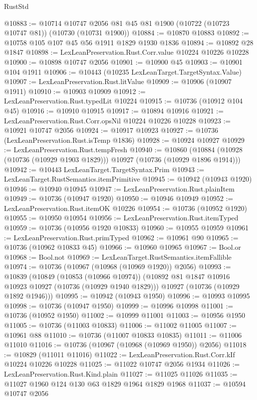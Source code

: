 \begin{lexlean}{RustStd}
\begin{coremodule}
@10883 := @10714 @10747 @2056 @81 @45 @81 @1900 (@10722 (@10723 @10747 @81)) (@10730 (@10731 @1900))
@10884 := @10870 @10883
@10892 := @10758 @105 @107 @45 @56 @1911 @1829 @1930 @1836
@10894 := @10892 @28 @1847
@10898 := LexLeanPreservation.Rust.Corr.value @10224 @10226 @10228
@10900 := @10898 @10747 @2056
@10901 := @10900 @45
@10903 := @10901 @104 @1911
@10906 := @10443 (@10235 LexLeanTarget.TargetSyntax.Value)
@10907 := LexLeanPreservation.Rust.litValue
@10909 := @10906 (@10907 @1911)
@10910 := @10903 @10909
@10912 := LexLeanPreservation.Rust.typedLit @10224
@10915 := @10736 (@10912 @104 @45)
@10916 := @10910 @10915
@10917 := @10894 @10916
@10921 := LexLeanPreservation.Rust.Corr.opsNil @10224 @10226 @10228
@10923 := @10921 @10747 @2056
@10924 := @10917 @10923
@10927 := @10736 (LexLeanPreservation.Rust.isTemp @1836)
@10928 := @10924 @10927
@10929 := LexLeanPreservation.Rust.tempFresh
@10940 := @10860
    (@10884 (@10928 (@10736 (@10929 @1903 @1829))) @10927 (@10736 (@10929 @1896 @1914)))
@10942 := @10443 LexLeanTarget.TargetSyntax.Prim
@10943 := LexLeanTarget.RustSemantics.itemPrimitive
@10945 := @10942 (@10943 @1920)
@10946 := @10940 @10945
@10947 := LexLeanPreservation.Rust.plainItem
@10949 := @10736 (@10947 @1920)
@10950 := @10946 @10949
@10952 := LexLeanPreservation.Rust.itemOK @10226
@10954 := @10736 (@10952 @1920)
@10955 := @10950 @10954
@10956 := LexLeanPreservation.Rust.itemTyped
@10959 := @10736 (@10956 @1920 @10833)
@10960 := @10955 @10959
@10961 := LexLeanPreservation.Rust.primTyped
@10962 := @10961 @90
@10965 := @10736 (@10962 @10833 @45)
@10966 := @10960 @10965
@10967 := Bool.or
@10968 := Bool.not
@10969 := LexLeanTarget.RustSemantics.itemFallible
@10974 := @10736 (@10967 (@10968 (@10969 @1920)) @2056)
@10993 := @10839
    (@10849
      (@10853 (@10966 @10974))
      (@10892 @81 @1847 @10916 @10923 @10927 (@10736 (@10929 @1940 @1829)))
      @10927
      (@10736 (@10929 @1892 @1946)))
@10995 := @10942 (@10943 @1950)
@10996 := @10993 @10995
@10998 := @10736 (@10947 @1950)
@10999 := @10996 @10998
@11001 := @10736 (@10952 @1950)
@11002 := @10999 @11001
@11003 := @10956 @1950
@11005 := @10736 (@11003 @10833)
@11006 := @11002 @11005
@11007 := @10961 @88
@11010 := @10736 (@11007 @10833 @10835)
@11011 := @11006 @11010
@11016 := @10736 (@10967 (@10968 (@10969 @1950)) @2056)
@11018 := @10829 (@11011 @11016)
@11022 := LexLeanPreservation.Rust.Corr.kIf @10224 @10226 @10228
@11025 := @11022 @10747 @2056 @1934
@11026 := LexLeanPreservation.Rust.Kind.plain
@11027 := @11025 @11026
@11035 := @11027 @1960 @124 @130 @63 @1829 @1964 @1829 @1968
@11037 := @10594 @10747 @2056

\end{coremodule}
\end{lexlean}
